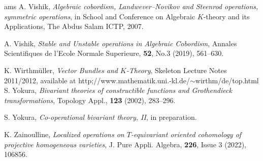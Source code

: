\documentclass[a4paper]{amsart}
\begin{document}
\begin{thebibliography}{ams}
 A. Vishik, {\it Algebraic cobordism, Landwever--Novikov and Steenrod operations, symmetric operations}, in School and Conference on Algebraic $K$-theory and its Applications, The Abdus Salam ICTP, 2007.

 A. Vishik, {\it Stable and Unstable operations in Algebraic Cobordism},  Annales Scientifiques de l'Ecole Normale Superieure, {\bf 52}, No.3 (2019), 561--630.

 K. Wirthm\"uller, {\it Vector Bundles and $K$-Theory}, Skeleton Lecture Notes 2011/2012, available at http;//www.mathematik.uni.-kl.de/$\sim$wirthm/de/top.html
 S. Yokura, {\it Bivariant theories of constructible functions and Grothendieck transformations}, Topology Appl.,  {\bf 123} (2002), 283--296.

 S. Yokura, {\it Co-operational bivariant theory, II}, in preparation.

 K. Zainoulline, {\it Localized operations on $T$-equivariant oriented cohomology of projective homogeneous varieties}, J. Pure Appli. Algebra, {\bf 226}, Issue 3 (2022), 106856.

\end{thebibliography}
\end{document}

